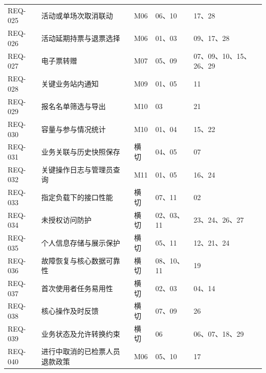 \documentclass[UTF8,zihao=-4,fontset=windows]{ctexart}
\begin{document}
\begin{small}
\begin{longtable}{p{17mm}p{40mm}p{16mm}p{20mm}p{45mm}}
REQ-025 & 活动或单场次取消联动 & M06 & 06、10 & 17、28 \\
REQ-026 & 活动延期持票与退票选择 & M06 & 01、03 & 09、17、28 \\
REQ-027 & 电子票转赠 & M07 & 05、09 & 07、09、10、15、26、29 \\
REQ-028 & 关键业务站内通知 & M09 & 01、05 & 11 \\
REQ-029 & 报名名单筛选与导出 & M10 & 03 & 21 \\
REQ-030 & 容量与参与情况统计 & M10 & 01、04 & 15、22 \\
REQ-031 & 业务关联与历史快照保存 & 横切 & 04、05 & 07 \\
REQ-032 & 关键操作日志与管理员查询 & M11 & 01、05 & 16、24 \\
REQ-033 & 指定负载下的接口性能 & 横切 & 07、11 & 02 \\
REQ-034 & 未授权访问防护 & 横切 & 02、03、11 & 23、24、26、27 \\
REQ-035 & 个人信息存储与展示保护 & 横切 & 05、11 & 12、21、24 \\
REQ-036 & 故障恢复与核心数据可靠性 & 横切 & 08、10、11 & 19 \\
REQ-037 & 首次使用者任务易用性 & 横切 & 02、03 & 04、14 \\
REQ-038 & 核心操作及时反馈 & 横切 & 07、09 & 26 \\
REQ-039 & 业务状态及允许转换约束 & 横切 & 06 & 06、07、18、29 \\
REQ-040 & 进行中取消的已检票人员退款政策 & M06 & 05、10 & 17 \\\bottomrule\end{longtable}\end{small}
\end{document}
